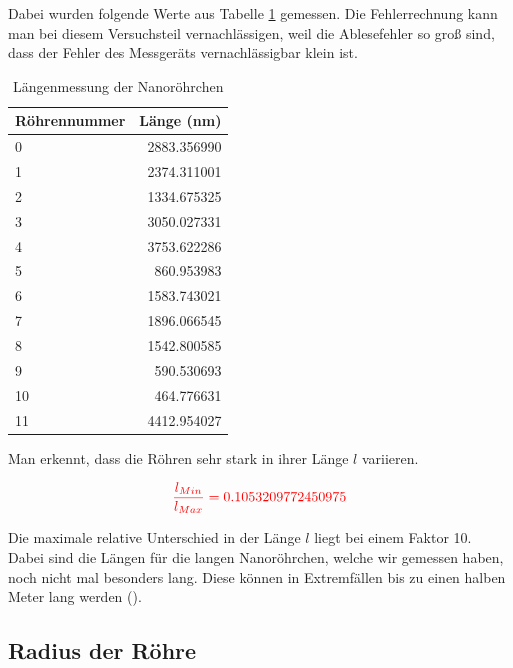 Dabei wurden folgende Werte aus Tabelle \ref{TabLaenge} gemessen. Die Fehlerrechnung kann man bei diesem 
Versuchsteil vernachlässigen, weil die Ablesefehler so groß sind, dass der Fehler des Messgeräts vernachlässigbar klein ist. \\

\begin{table}
    \centering
    \begin{tabular}{lr}
        \toprule
        Röhrennummer &   Länge (nm) \\
        \midrule
        0  &  2883.356990 \\
        1  &  2374.311001 \\
        2  &  1334.675325 \\
        3  &  3050.027331 \\
        4  &  3753.622286 \\
        5  &   860.953983 \\
        6  &  1583.743021 \\
        7  &  1896.066545 \\
        8  &  1542.800585 \\
        9  &   590.530693 \\
        10 &   464.776631 \\
        11 &  4412.954027 \\
        \bottomrule
    \end{tabular}
    \caption{Längenmessung der Nanoröhrchen}
    \label{TabLaenge}
\end{table}

Man erkennt, dass die Röhren sehr stark in ihrer Länge $l$  variieren.

\begin{equation}
    \textcolor{red}{\frac{l_{Min}}{l_{Max}} = 0.1053209772450975}
\end{equation}

Die maximale relative Unterschied in der Länge $l$ liegt bei einem Faktor 10. Dabei sind die Längen für die langen 
Nanoröhrchen, welche wir gemessen haben, noch nicht mal besonders lang. Diese können in Extremfällen bis zu
einen halben Meter lang werden (\cite{Dagani2002}).

\subsection*{Radius der Röhre}

